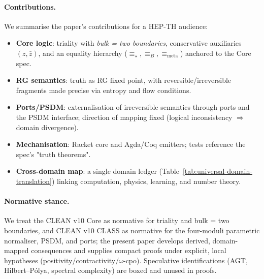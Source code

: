 \paragraph{Contributions.} We summarise the paper's contributions for a HEP-TH audience:
\begin{itemize}
\item \textbf{Core logic}: triality with \emph{bulk = two boundaries}, conservative auxiliaries $(z,\bar z)$, and an equality hierarchy ($\equiv_\star,\equiv_B,\equiv_{\text{meta}}$) anchored to the Core spec.
\item \textbf{RG semantics}: truth as RG fixed point, with reversible/irreversible fragments made precise via entropy and flow conditions.
\item \textbf{Ports/PSDM}: externalisation of irreversible semantics through ports and the PSDM interface; direction of mapping fixed (logical inconsistency $\Rightarrow$ domain divergence).
\item \textbf{Mechanisation}: Racket core and Agda/Coq emitters; tests reference the spec's "truth theorems".
\item \textbf{Cross-domain map}: a single domain ledger (Table~\ref{tab:universal-domain-translation}) linking computation, physics, learning, and number theory.
\end{itemize}

\paragraph{Normative stance.} We treat the CLEAN v10 Core as normative for triality and bulk = two boundaries, and CLEAN v10 CLASS as normative for the four-moduli parametric normaliser, PSDM, and ports; the present paper develops derived, domain-mapped consequences and supplies compact proofs under explicit, local hypotheses (positivity/contractivity/$\omega$-cpo). Speculative identifications (AGT, Hilbert–Pólya, spectral complexity) are boxed and unused in proofs.
